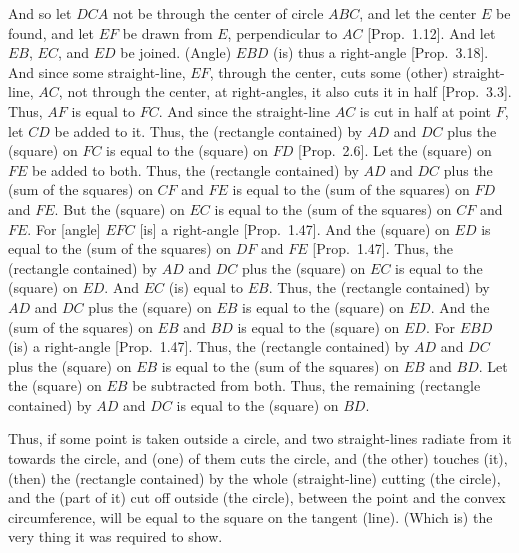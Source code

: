 \begin{Parallel}{}{}
{And so let $DCA$ not be through the center of circle $ABC$, and let the center $E$
be found, and let $EF$ be drawn from $E$, perpendicular to
$AC$ [Prop.~1.12]. And let $EB$, $EC$, and $ED$ be joined. (Angle)
$EBD$ (is) thus a right-angle [Prop.~3.18]. And since some straight-line, $EF$, through the
center, cuts some (other) straight-line, $AC$, not through the center, at
right-angles, it also cuts it in half [Prop.~3.3]. Thus, $AF$ is equal to
$FC$. And since the straight-line $AC$ is cut in half at point $F$, let $CD$ 
be added to it. Thus, the (rectangle contained) by $AD$ and
 $DC$ plus the
(square) on $FC$ is equal to the (square) on $FD$ [Prop.~2.6]. Let
the (square) on $FE$ be added to both. Thus, the (rectangle contained)
by $AD$ and $DC$ plus the (sum of the squares) on $CF$ and $FE$ is equal to
the (sum of the squares) on $FD$ and $FE$. But  the (square) on $EC$  is equal to the (sum of the squares)
on $CF$ and $FE$. For [angle] $EFC$ [is] a
right-angle [Prop.~1.47]. And the (square) on $ED$ is equal to the (sum of the squares) on $DF$ and
$FE$   [Prop.~1.47]. Thus, the (rectangle
contained) by $AD$ and $DC$ plus the (square) on $EC$ is equal to the (square)
on $ED$. And $EC$ (is) equal to $EB$. Thus, the (rectangle
contained) by $AD$ and $DC$ plus the (square) on $EB$ is equal to the (square)
on $ED$. And the (sum of the squares) on 
$EB$ and $BD$  is equal to  the (square) on $ED$. For $EBD$ (is) a right-angle [Prop.~1.47]. Thus, the (rectangle
contained) by $AD$ and $DC$ plus the (square) on $EB$ is equal to the (sum of the squares)
on $EB$ and $BD$. Let the (square) on $EB$ be subtracted from both. Thus, the remaining
(rectangle contained) by $AD$ and $DC$ is equal to the (square) on $BD$.

Thus, if some point is taken outside a circle, and  two straight-lines
radiate from it towards the circle, and (one) of them cuts the circle, and (the other) touches (it), (then) the (rectangle contained) by the whole  (straight-line) cutting (the circle), and the (part of it) 
cut off outside (the circle),
between the point and the convex circumference, will be equal to the
square on the tangent (line). (Which is) the very thing it was required to show.}
\end{Parallel}

